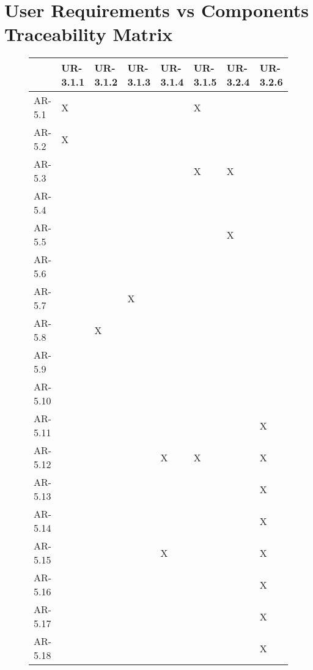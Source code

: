\section{User Requirements vs Components Traceability Matrix}

\begin{figure}[H]
\centering
\begin{tabular}{ | l | l | l | l | l | l | l | l |}
  \hline
    & UR-3.1.1 & UR-3.1.2 & UR-3.1.3 & UR-3.1.4 & UR-3.1.5 & UR-3.2.4 & UR-3.2.6\\ \hline
   AR-5.1 & X &  &  &  & X &  & \\ \hline
   AR-5.2 & X &  &  &  &  &  &  \\ \hline
   AR-5.3 &  &  &  &  & X & X &  \\ \hline
   AR-5.4 &  &  &  &  &  &  &  \\ \hline
   AR-5.5 &  &  &  &  &  & X &  \\ \hline
   AR-5.6 &  &  &  &  &  &  &  \\ \hline
   AR-5.7 &  &  & X &  &  &  &  \\ \hline
   AR-5.8 &  & X &  &  &  &  &  \\ \hline
   AR-5.9 &  &  &  &  &  &  &  \\ \hline
   AR-5.10 &  &  &  &  &  &  &  \\ \hline
   AR-5.11 &  &  &  &  &  &  & X \\ \hline
   AR-5.12 & &  &  & X & X &  & X \\ \hline
   AR-5.13 &  &  &  &  &  &  & X \\ \hline
   AR-5.14 &  &  &  &  &  &  & X \\ \hline
   AR-5.15 &  &  &  & X &  &  & X \\ \hline
   AR-5.16 &  &  &  &   &  &  & X \\ \hline
   AR-5.17 &  &  &  &  &  &  & X \\ \hline
   AR-5.18 &  &  &  &  &  &  & X \\ \hline
\end{tabular}
\end{figure}